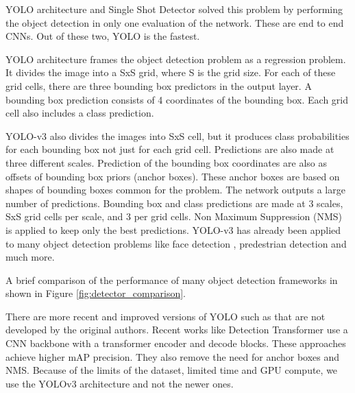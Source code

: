 \documentclass[10pt,twocolumn,letterpaper]{article}
\begin{document}
YOLO architecture and Single Shot Detector \cite{SSD_v1} solved this problem by performing the object detection in only one evaluation of the network. These are end to end CNNs. Out of these two, YOLO is the fastest. 

YOLO architecture frames the object detection problem as a regression problem. It divides the image into a SxS grid, where S is the grid size. For each of these grid cells, there are three bounding box predictors in the output layer. A bounding box prediction consists of 4 coordinates of the bounding box. Each grid cell also includes a class prediction. 

YOLO-v3 also divides the images into SxS cell, but it produces class probabilities for each bounding box not just for each grid cell. Predictions are also made at three different scales. Prediction of the bounding box coordinates are also as offsets of bounding box priors (anchor boxes). These anchor boxes are based on shapes of bounding boxes common for the problem. The network outputs a large number of predictions. Bounding box and class predictions are made at 3 scales, SxS grid cells per scale, and 3 per grid cells. Non Maximum Suppression (NMS) is applied to keep only the best predictions. YOLO-v3 has already been applied to many object detection problems like face detection \cite{face_detection_yolo}, predestrian detection \cite{pedestrian_detection} and much more.

A brief comparison of the performance of many object detection frameworks in shown in Figure \ref {fig:detector_comparison}.

There are more recent and improved versions of YOLO such as \cite{yolov7} that are not developed by the original authors. Recent works like Detection Transformer \cite{DETR} use a CNN backbone with a transformer encoder and decode blocks. These approaches achieve higher mAP precision. They also remove the need for anchor boxes and NMS. Because of the limits of the dataset, limited time and GPU compute, we use the YOLOv3 architecture and not the newer ones.
\end{document}

